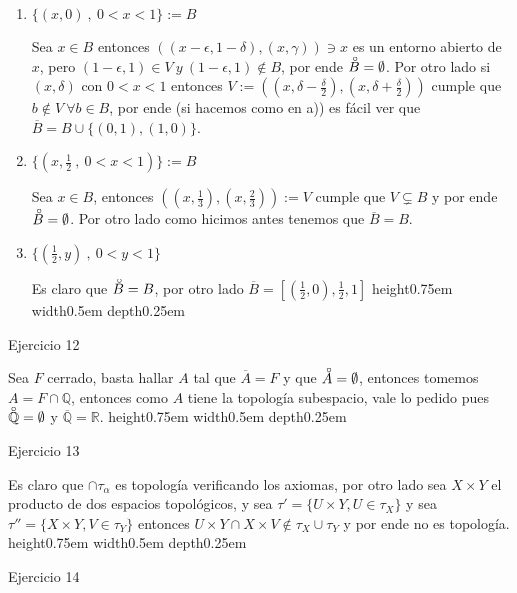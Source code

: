 \documentclass[11pt]{article}
\newcommand{\Q}{\mathbb{Q}}
\newcommand{\R}{{\mathbb{R}}}
\newcommand{\sett}[1]{\{#1\}}
\newcommand{\interior}[1]{\accentset{\smash{\raisebox{-0.12ex}{$\scriptstyle\circ$}}}{#1}\rule{0pt}{2.3ex}}
\newenvironment{proof}[1][Demostraci\'on]{\begin{trivlist}
\item[\hskip \labelsep {\bfseries #1}]}{\end{trivlist}}
\newcommand{\qed}{\nobreak \ifvmode \relax \else
      \ifdim\lastskip<1.5em \hskip-\lastskip
      \hskip1.5em plus0em minus0.5em \fi \nobreak
      \vrule height0.75em width0.5em depth0.25em\fi}
\begin{document}
\begin{enumerate}
\begin{proof}
\begin{enumerate}
\item{$\sett{(x,0) \ , \ 0<x<1}:=B$}

Sea $x \in B$ entonces $((x-\epsilon,1-\delta),(x,\gamma)) \ni x$ es un entorno abierto de $x$, pero $(1-\epsilon,1) \in V \ y \ (1-\epsilon,1) \not \in B$, por ende $\interior{B}=\emptyset$. Por otro lado si $(x,\delta)$ con $0<x<1$ entonces $V := ((x,\delta-\frac{\delta}{2}),(x,\delta + \frac{\delta}{2}))$ cumple que $b \not \in V \ \forall b \in B$, por ende (si hacemos como en a)) es f\'acil ver que $\overline{B} = B \cup \sett{(0,1),(1,0)}$.

\item {$\sett{(x,\frac{1}{2} \ , \ 0<x<1)} :=B$}

Sea $x \in B$, entonces $((x,\frac{1}{3}),(x,\frac{2}{3})):=V$  cumple que $V \subsetneq B$ y por ende $\interior{B} = \emptyset$. Por otro lado como hicimos antes tenemos que $\overline{B}=B$.

\item {$\sett{(\frac{1}{2},y) \ , \ 0<y<1}$}

Es claro que $\interior{B}=B$, por otro lado $\overline{B}=[(\frac{1}{2},0),\frac{1}{2},1]$ \qed

\end{enumerate}


\end{proof}

\item {Ejercicio 12}

\begin{proof}
Sea $F $ cerrado, basta hallar $A$ tal que $\overline{A}=F$ y que $\interior{A}=\emptyset$, entonces tomemos $A = F \cap \Q$, entonces como $A$ tiene la topolog\'ia subespacio, vale lo pedido pues $\interior{\Q}=\emptyset$ y $\overline{\Q}=\R$. \qed
\end{proof}

\item {Ejercicio 13}

\begin{proof}
Es claro que $\cap{\tau_{\alpha}}$ es topolog\'ia verificando los axiomas, por otro lado sea $X \times Y$  el producto de dos espacios topol\'ogicos, y sea $\tau' = \sett{U \times Y, U \in \tau_X}$ y sea $\tau'' = \sett{X \times Y , V \in \tau_Y}$ entonces $U \times Y \cap X \times V \not \in \tau_X \cup \tau_Y$ y por ende no es topolog\'ia. \qed
\end{proof}

\item {Ejercicio 14}


\end{enumerate}
\end{document}
